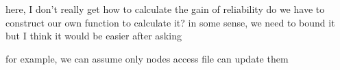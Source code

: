 here, I don't really get how to calculate the gain of reliability
do we have to construct our own function to calculate it?
in some sense, we need to bound it 
but I think it would be easier after asking

for example, we can assume only nodes access file can update them